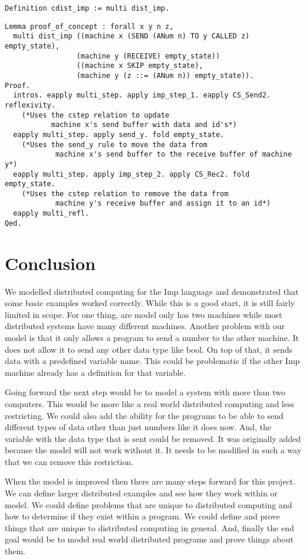 \documentclass{llncs}
\begin{document}
\begin{lstlisting}
Definition cdist_imp := multi dist_imp.
\end{lstlisting}

\begin{lstlisting}
Lemma proof_of_concept : forall x y n z,
  multi dist_imp ((machine x (SEND (ANum n) TO y CALLED z) empty_state),
                 (machine y (RECEIVE) empty_state))
                 ((machine x SKIP empty_state), 
                 (machine y (z ::= (ANum n)) empty_state)).
Proof. 
  intros. eapply multi_step. apply imp_step_1. eapply CS_Send2. reflexivity.
    (*Uses the cstep relation to update
           machine x's send buffer with data and id's*)
  eapply multi_step. apply send_y. fold empty_state. 
    (*Uses the send_y rule to move the data from
            machine x's send buffer to the receive buffer of machine y*)
  eapply multi_step. apply imp_step_2. apply CS_Rec2. fold empty_state. 
    (*Uses the cstep relation to remove the data from 
            machine y's receive buffer and assign it to an id*)
  eapply multi_refl. 
Qed.
\end{lstlisting}

\section{Conclusion}
We modelled distributed computing for the Imp language and demonstrated that some basic examples worked correctly. While this is a good start, it is still fairly limited in scope. For one thing, are model only has two machines while most distributed systems have many different machines. Another problem with our model is that it only allows a program to send a number to the other machine. It does not allow it to send any other data type like bool. On top of that, it sends data with a predefined variable name. This could be problematic if the other Imp machine already has a definition for that variable. 

Going forward the next step would be to model a system with more than two computers. This would be more like a real world distributed computing and less restricting. We could also add the ability for the programs to be able to send different types of data other than just numbers like it does now. And, the variable with the data type that is sent could be removed. It was originally added because the model will not work without it. It needs to be modified in such a way that we can remove this restriction. 

When the model is improved then there are many steps forward for this project. We can define larger distributed examples and see how they work within or model. We could define problems that are unique to distributed computing and how to determine if they exist within a program. We could define and prove things that are unique to distributed computing in general. And, finally the end goal would be to model real world distributed programs and prove things about them. 



\end{document}
